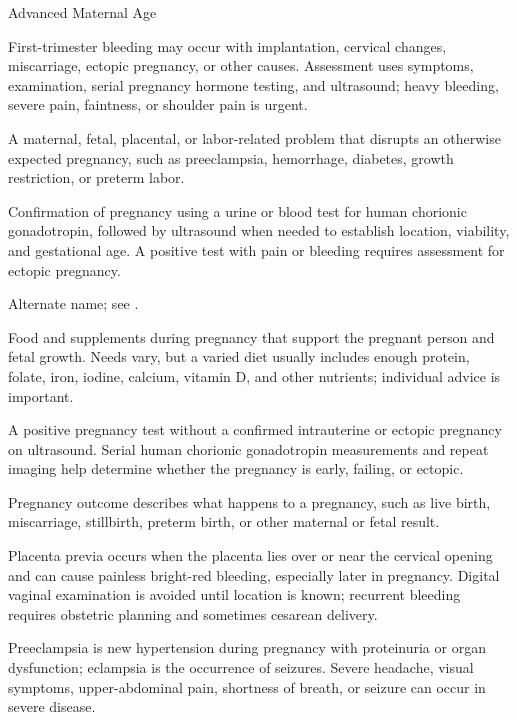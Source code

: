 \synonyms
Advanced Maternal Age

 First-trimester bleeding may occur with implantation, cervical changes, miscarriage, ectopic pregnancy, or other causes. Assessment uses symptoms, examination, serial pregnancy hormone testing, and ultrasound; heavy bleeding, severe pain, faintness, or shoulder pain is urgent.

 A maternal, fetal, placental, or labor-related problem that disrupts an otherwise expected pregnancy, such as preeclampsia, hemorrhage, diabetes, growth restriction, or preterm labor.

 Confirmation of pregnancy using a urine or blood test for human chorionic gonadotropin, followed by ultrasound when needed to establish location, viability, and gestational age. A positive test with pain or bleeding requires assessment for ectopic pregnancy.

 Alternate name; see .

 Food and supplements during pregnancy that support the pregnant person and fetal growth. Needs vary, but a varied diet usually includes enough protein, folate, iron, iodine, calcium, vitamin D, and other nutrients; individual advice is important.

 A positive pregnancy test without a confirmed intrauterine or ectopic pregnancy on ultrasound. Serial human chorionic gonadotropin measurements and repeat imaging help determine whether the pregnancy is early, failing, or ectopic.

 Pregnancy outcome describes what happens to a pregnancy, such as live birth, miscarriage, stillbirth, preterm birth, or other maternal or fetal result.

 Placenta previa occurs when the placenta lies over or near the cervical opening and can cause painless bright-red bleeding, especially later in pregnancy. Digital vaginal examination is avoided until location is known; recurrent bleeding requires obstetric planning and sometimes cesarean delivery.

 Preeclampsia is new hypertension during pregnancy with proteinuria or organ dysfunction; eclampsia is the occurrence of seizures. Severe headache, visual symptoms, upper-abdominal pain, shortness of breath, or seizure can occur in severe disease.

